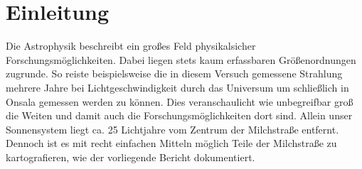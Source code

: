 \section{Einleitung}
Die Astrophysik beschreibt ein großes Feld physikalsicher Forschungsmöglichkeiten.
Dabei liegen stets kaum erfassbaren Größenordnungen zugrunde.
So reiste beispielsweise die in diesem Versuch gemessene Strahlung mehrere Jahre bei Lichtgeschwindigkeit durch das Universum um schließlich in Onsala gemessen werden zu können.
Dies veranschaulicht wie unbegreifbar groß die Weiten und damit auch die Forschungsmöglichkeiten dort sind.
Allein unser Sonnensystem liegt ca. 25 Lichtjahre vom Zentrum der Milchstraße entfernt.
Dennoch ist es mit recht einfachen Mitteln möglich Teile der Milchstraße zu kartografieren, wie der vorliegende Bericht dokumentiert.
\newline